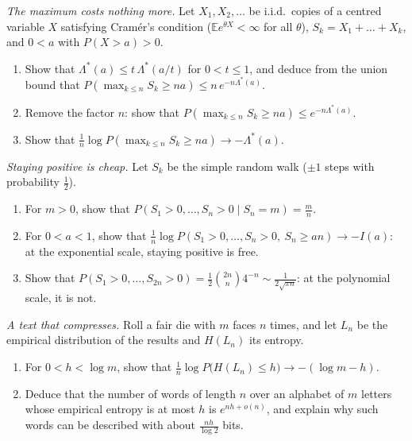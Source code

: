 \begin{exercise}[$\star$]\label{pb:maxexp}
\emph{The maximum costs nothing more.} Let $X_1,X_2,\dots$ be i.i.d.\ copies of a centred variable $X$ satisfying Cram\'er's condition ($\mathbb Ee^{\theta X}<\infty$ for all
$\theta$), $S_k=X_1+\dots+X_k$, and $0<a$ with $P(X>a)>0$.
\begin{enumerate}[label=(\alph*)]
\item Show that $\Lambda^*(a)\le t\,\Lambda^*(a/t)$ for $0<t\le1$, and deduce from the union bound that $P(\max_{k\le n}S_k\ge na)\le n\,e^{-n\Lambda^*(a)}$.
\item Remove the factor $n$: show that $P(\max_{k\le n}S_k\ge na)\le e^{-n\Lambda^*(a)}$.
\item Show that $\frac1n\log P(\max_{k\le n}S_k\ge na)\to-\Lambda^*(a)$.
\end{enumerate}
\end{exercise}

\begin{exercise}[$\star$]\label{pb:positivewalk}
\emph{Staying positive is cheap.} Let $S_k$ be the simple random walk ($\pm1$ steps with probability $\frac12$).
\begin{enumerate}[label=(\alph*)]
\item For $m>0$, show that $P(S_1>0,\dots,S_n>0\mid S_n=m)=\frac mn$.
\item For $0<a<1$, show that $\frac1n\log P(S_1>0,\dots,S_n>0,\ S_n\ge an)\to-I(a)$: at the exponential scale, staying positive is free.
\item Show that $P(S_1>0,\dots,S_{2n}>0)=\frac12\binom{2n}n4^{-n}\sim\frac1{2\sqrt{\pi n}}$: at the polynomial scale, it is not.
\end{enumerate}
\end{exercise}

\begin{exercise}[$\star$]\label{pb:lowentropy}
\emph{A text that compresses.} Roll a fair die with $m$ faces $n$ times, and let $L_n$ be the empirical distribution of the results and $H(L_n)$ its entropy.
\begin{enumerate}[label=(\alph*)]
\item For $0<h<\log m$, show that $\frac1n\log P\bigl(H(L_n)\le h\bigr)\to-(\log m-h)$.
\item Deduce that the number of words of length $n$ over an alphabet of $m$ letters whose empirical entropy is at most $h$ is $e^{nh+o(n)}$, and explain why such words can be
described with about $\frac{nh}{\log2}$ bits.
\end{enumerate}
\end{exercise}

